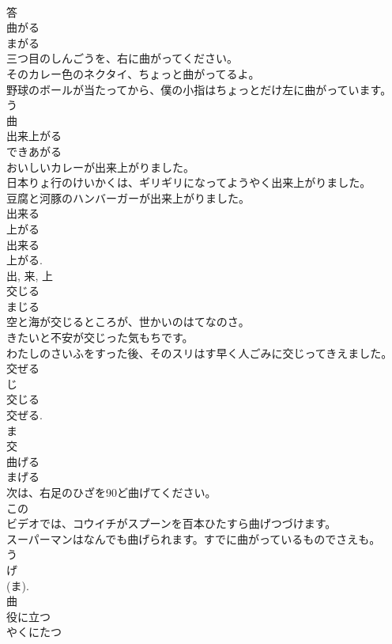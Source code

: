 \documentclass[8pt]{extreport}
\begin{document}
\begin{CJK}{UTF8}{min}
\\	答	
\\	曲がる	
\\	まがる	
\\	三つ目のしんごうを、右に曲がってください。	
\\	そのカレー色のネクタイ、ちょっと曲がってるよ。	
\\	野球のボールが当たってから、僕の小指はちょっとだけ左に曲がっています。	
\\	う 
\\	曲	
\\	出来上がる	
\\	できあがる	
\\	おいしいカレーが出来上がりました。	
\\	日本りょ行のけいかくは、ギリギリになってようやく出来上がりました。	
\\	豆腐と河豚のハンバーガーが出来上がりました。	
\\	出来る 
\\	上がる 
\\	出来る 
\\	上がる. 
\\	出, 来, 上	
\\	交じる	
\\	まじる	
\\	空と海が交じるところが、世かいのはてなのさ。	
\\	きたいと不安が交じった気もちです。	
\\	わたしのさいふをすった後、そのスリはす早く人ごみに交じってきえました。	
\\	交ぜる 
\\	じ 
\\	交じる 
\\	交ぜる. 
\\	ま 
\\	交	
\\	曲げる	
\\	まげる	
\\	次は、右足のひざを90ど曲げてください。	
\\	この
\\	ビデオでは、コウイチがスプーンを百本ひたすら曲げつづけます。	
\\	スーパーマンはなんでも曲げられます。すでに曲がっているものでさえも。	
\\	う 
\\	げ 
\\	(ま). 
\\	曲	
\\	役に立つ	
\\	やくにたつ	

\end{CJK}
\end{document}
